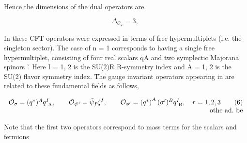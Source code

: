 \documentclass{article}
\begin{document}
Hence the dimensions of the dual operators are.


\begin{equation}
\Delta _ { \mathcal { O } _ { \varphi } } = 3, ~
\end{equation}


In these CFT operators were expressed in terms of free hypermultiplets (i.e. the singleton
sector). The case of n = 1 corresponds to having a single free hypermultiplet, consisting of
four real scalars qA and two symplectic Majorana spinors '. Here I = 1, 2 is the SU(2)R
R-symmetry index and A = 1, 2 is the SU(2) flavor symmetry index. The gauge invariant
operators appearing in are related to these fundamental fields as follows,


\begin{equation}
\begin{array} { r l } { \mathcal { O } _ { \sigma } = ( q ^ { * } ) ^ { A } q _ { \mathrm { ~ A } } ^ { I }, \qquad \mathcal { O } _ { \phi ^ { 0 } } = \tilde { \psi } _ { f } \zeta ^ { I }, \qquad \mathcal { O } _ { \phi ^ { \prime } } = \left ( q ^ { * } \right ) ^ { A } ( \sigma ^ { \prime } ) ^ { B } q _ { \mathrm { ~ B } } ^ { I }, \quad r = 1, 2, 3 \qquad ( 6 ) } \\ { \mathrm { ~ o t h e ~ a d. ~ b e}}\end{array}
\end{equation}


Note that the first two operators correspond to mass terms for the scalars and fermions
\end{document}
